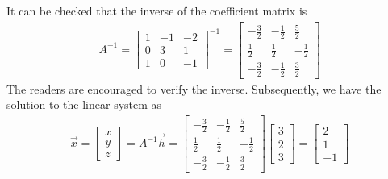 \begin{solution}
It can be checked that the inverse of the coefficient matrix is
\begin{align*}
A^{-1} =
\begin{bmatrix}
1 & -1 & -2 \\
0 & 3 & 1 \\
1 & 0 & -1
\end{bmatrix}^{-1}   
=
\begin{bmatrix}
-\frac{3}{2} & -\frac{1}{2} & \frac{5}{2} \\
\frac{1}{2} & \frac{1}{2} & -\frac{1}{2} \\
-\frac{3}{2} & -\frac{1}{2} & \frac{3}{2}
\end{bmatrix}
\end{align*}
The readers are encouraged to verify the inverse. Subsequently, we have the solution to the linear system as
\begin{align*}
\vec{x} = 
\begin{bmatrix}
x \\
y \\
z
\end{bmatrix}
= A^{-1}\vec{h} =  
\begin{bmatrix}
-\frac{3}{2} & -\frac{1}{2} & \frac{5}{2} \\
\frac{1}{2} & \frac{1}{2} & -\frac{1}{2} \\
-\frac{3}{2} & -\frac{1}{2} & \frac{3}{2}
\end{bmatrix}
\begin{bmatrix}
3 \\
2 \\
3
\end{bmatrix}
=
\begin{bmatrix}
2 \\
1 \\
-1
\end{bmatrix}
\end{align*}
\end{solution}

